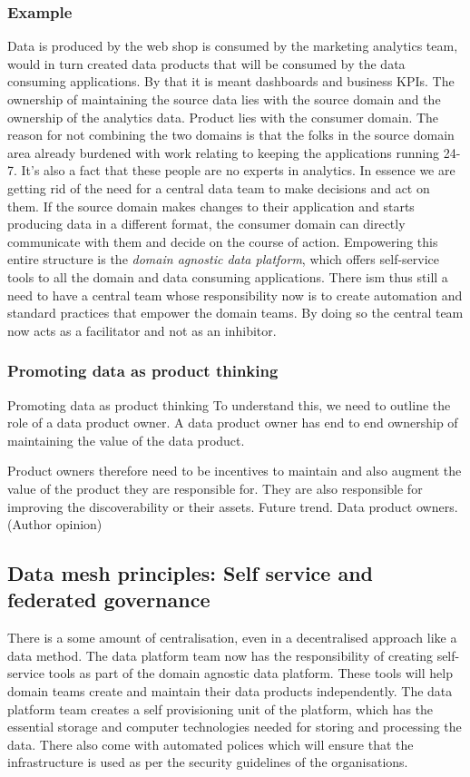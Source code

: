 \subsubsection{Example}
Data is produced by the web shop is consumed by the marketing analytics team, would in turn created data products that will be consumed by the data consuming applications.
By that it is meant dashboards and business KPIs.
The ownership of maintaining the source data lies with the source domain and the ownership of the analytics data.
Product lies with the consumer domain.
The reason for not combining the two domains is that the folks in the source domain area already burdened with work relating to keeping the applications running 24-7.
It's also a fact that these people are no experts in analytics.
In essence we are getting rid of the need for a central data team to make decisions and act on them.
If the source domain makes changes to their application and starts producing data in a different format, the consumer domain can directly communicate with them and decide on the course of action.
Empowering this entire structure is the \textit{domain agnostic data platform}, which offers self-service tools to all the domain and data consuming applications.
There ism thus still a need to have a central team whose responsibility now is to create automation and standard practices that empower the domain teams.
By doing so the central team now acts as a facilitator and not as an inhibitor.

\subsubsection{Promoting data as product thinking}
Promoting data as product thinking
To understand this, we need to outline the role of a data product owner.
A data product owner has end to end ownership of maintaining the value of the data product.

Product owners therefore need to be incentives to maintain and also augment the value of the product they are responsible for.
They are also responsible for improving the discoverability or their assets.
Future trend. Data product owners. (Author opinion)

\subsection{Data mesh principles: Self service and federated governance}
There is a some amount of centralisation, even in a decentralised approach like a data method.
The data platform team now has the responsibility of creating self-service tools as part of the domain agnostic data platform.
These tools will help domain teams create and maintain their data products independently.
The data platform team creates a self provisioning unit of the platform, which has the essential storage and computer technologies needed for storing and processing the data.
There also come with automated polices which will ensure that the infrastructure is used as per the security guidelines of the organisations.

